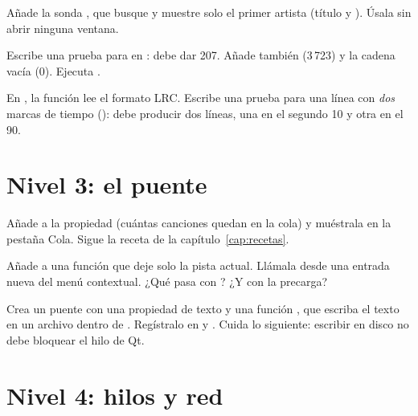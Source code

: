 \begin{ejercicio}
Añade la sonda , que busque y muestre solo el primer artista
(título y ). Úsala sin abrir ninguna ventana.
\end{ejercicio}

\begin{ejercicio}
Escribe una prueba para  en : debe dar 207. Añade
también  (3\,723) y la cadena vacía (0). Ejecuta
.
\end{ejercicio}

\begin{ejercicio}[2.3 Un parseador]
En , la función  lee el formato LRC. Escribe una prueba para una
línea con \emph{dos} marcas de tiempo (): debe producir dos
líneas, una en el segundo 10 y otra en el 90.
\end{ejercicio}

\section{Nivel 3: el puente}

\begin{ejercicio}
Añade a  la propiedad  (cuántas canciones quedan en la cola) y
muéstrala en la pestaña Cola. Sigue la receta de la capítulo~\ref{cap:recetas}.
\end{ejercicio}

\begin{ejercicio}
Añade a  una función  que deje solo la pista actual. Llámala
desde una entrada nueva del menú contextual. ¿Qué pasa con ? ¿Y con la precarga?
\end{ejercicio}

\begin{ejercicio}
Crea un puente  con una propiedad de texto y una función , que escriba
el texto en un archivo dentro de . Regístralo en 
y . Cuida lo siguiente: escribir en disco no debe bloquear el hilo de Qt.
\end{ejercicio}

\section{Nivel 4: hilos y red}

